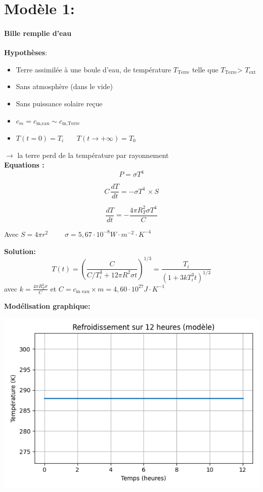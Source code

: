 \documentclass[a4paper,12pt]{article}
\begin{document}
\part{Modèle 1:}
\subsection{Bille remplie d'eau}
\textbf{Hypothèses}:
\begin{itemize}
    \item Terre assimilée à une boule d'eau, de température \(T_{\text{Terre}}\) telle que \(T_{\text{Terre}}\)> \(T_{\text{ext}}\)
    \item  Sans atmosphère (dans le vide)
    \item  Sans puissance solaire reçue  
    \item \(c_{m}= c_{\text{m,eau}} \sim c_{\text{m,Terre}}\) 
    \item $T(t=0) = T_i$ \ \ \
$T(t \to +\infty) = T_0$
   
\end{itemize}
$\rightarrow$ la terre perd de la température par rayonnement
\\ 
\textbf{Equations :} 
\[   P= \sigma T^4 
\]

\[    C \, \frac{dT}{dt} = - \sigma T^4 \,  \times S
\]

\[\frac{dT}{dt} = - \frac{4 \pi R_T^2 \sigma T^4}{C}\]  

Avec 
\(S= 4\pi r^2\)
\ \ \ \
\(\sigma=5,67 \cdot 10^{-8} W\cdot m^{-2} \cdot K^{-4}\)

\textbf{Solution:} 
\[
T(t) = \left( \frac{C}{C/T_i^3 + 12\pi R^2 \sigma t} \right)^{1/3} 
= \frac{T_i}{\left(1 + 3k T_i^3 t \right)^{1/3}}
\]
avec \(k=\frac{4\pi R_T^2 \sigma}{C}\)
et \(C=c_{\text{m eau}}\times m=4,60 \cdot 10^{27} J\cdot K^{-1}\)

\bigskip



\bigskip
\textbf{Modélisation graphique:} 
    
    \includegraphics[width=0.8\linewidth]{../modele1/figures/modele1.png}
\\
\end{document}
